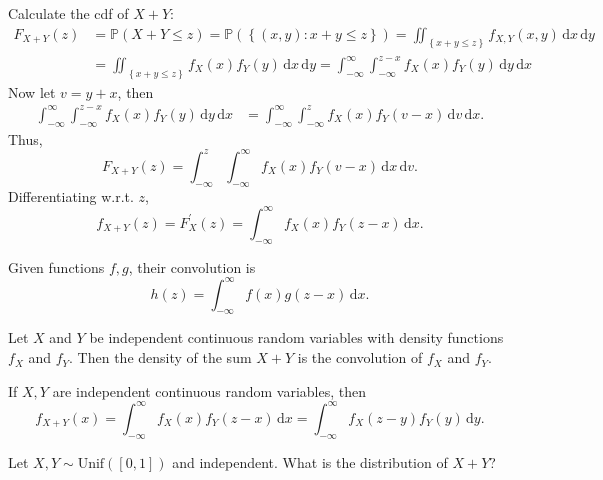 \begin{answer}
    Calculate the cdf of \(X + Y\):
    \begin{align*}
        F_{X + Y}(z) &= \mathbb{P} (X + Y \le z) = \mathbb{P} (\left\{ (x, y): x + y \le z \right\} ) = \iint_{\left\{ x+y \le z \right\} } f_{X, Y}(x, y) \, \mathrm{d} x \, \mathrm{d} y \\
        &= \iint_{\left\{ x+y \le z \right\} } f_X(x) f_Y(y) \, \mathrm{d} x \, \mathrm{d} y = \int _{-\infty }^{\infty} \int _{-\infty }^{z - x} f_X(x) f_Y(y) \, \mathrm{d} y \, \mathrm{d} x    
    \end{align*} 
    Now let \(v = y + x\), then 
    \begin{align*}
       \int _{-\infty }^{\infty} \int _{-\infty }^{z - x} f_X(x) f_Y(y) \, \mathrm{d} y \, \mathrm{d} x &= \int _{-\infty }^{\infty} \int _{-\infty }^{z} f_X(x) f_Y(v - x) \, \mathrm{d} v \, \mathrm{d} x .  
    \end{align*} 
    Thus,
    \[
        F_{X+Y}(z) = \int _{-\infty }^z \int _{-\infty }^{\infty} f_X(x) f_Y(v-x) \, \mathrm{d} x \, \mathrm{d} v.  
    \]
    Differentiating w.r.t. \(z\),
    \[
        f_{X+Y}(z) = F_X^{\prime} (z) = \int _{-\infty }^{\infty} f_X(x) f_Y(z - x) \, \mathrm{d} x. 
    \] 
\end{answer}

\begin{definition}
    Given functions \(f, g\), their convolution is 
    \[
        h(z) = \int _{-\infty }^{\infty } f(x) g(z - x) \, \mathrm{d} x .  
    \] 
\end{definition}

\begin{proposition}
    Let \(X\) and \(Y\) be independent continuous random variables with density functions \(f_X\) and \(f_Y\). Then the density of the sum \(X + Y\) is the convolution of \(f_X\) and \(f_Y\).       
\end{proposition}

\begin{corollary}
    If \(X, Y\) are independent continuous random variables, then  
    \[
        f_{X + Y}(x) = \int _{-\infty }^{\infty } f_X(x) f_Y(z - x) \, \mathrm{d} x = \int _{-\infty }^{\infty} f_X(z - y) f_Y(y) \, \mathrm{d} y.  
    \]
\end{corollary}

\begin{eg}
    Let \(X, Y \sim \mathrm{Unif}([0, 1]) \) and independent. What is the distribution of \(X + Y\)?  
\end{eg}

